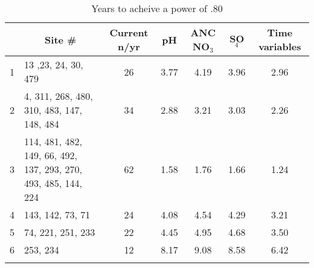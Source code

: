 \begin{table}[htbp]
\caption{Years to acheive a power of .80}
\begin{tabular}{clccccc}
\hline\noalign{\smallskip}
\multicolumn{1}{p{2cm}}{Elevation Bands} & \multicolumn{1}{c}{Site \#} & \multicolumn{1}{p{2cm}}{Current n/yr} & pH &\multicolumn{1}{p{1cm}}{ ANC NO$_3$} & SO$_4$ & \multicolumn{1}{p{3cm}}{Time variables} \\  
\hline\noalign{\smallskip}
1 & 13 ,23, 24, 30, 479 & 26 & 3.77  & 4.19  & 3.96  & 2.96  \\ 
2 & \multicolumn{1}{p{4cm}}{4, 311, 268, 480, 310, 483, 147, 148, 484} & 34 & 2.88  & 3.21  & 3.03  & 2.26  \\ 
3 & \multicolumn{ 1}{p{4cm}}{114, 481, 482, 149, 66, 492, 137, 293, 270, 493, 485, 144, 224} & \multicolumn{ 1}{c}{62} & \multicolumn{ 1}{c}{1.58 } & \multicolumn{ 1}{c}{1.76 } & \multicolumn{ 1}{c}{1.66 } & \multicolumn{ 1}{c}{1.24} \\ 
4 & 143, 142, 73, 71 & 24 & 4.08  & 4.54  & 4.29  & 3.21  \\ 
5 & 74, 221, 251, 233 & 22 & 4.45  & 4.95  & 4.68  & 3.50  \\ 
6 & 253, 234 & 12 & 8.17  & 9.08  & 8.58  & 6.42  \\  \hline\noalign{\smallskip}
\end{tabular}
\label{tab:currentyrsto.80}
\end{table}